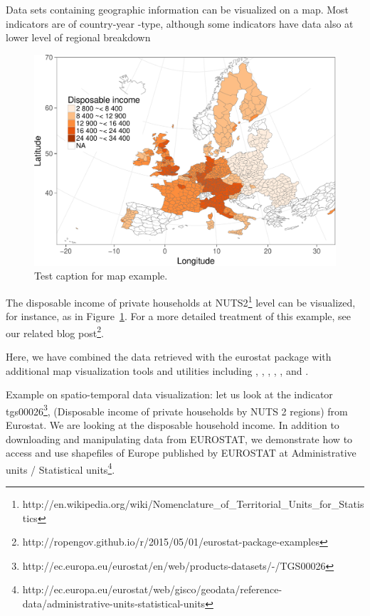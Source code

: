 Data sets containing geographic information can be visualized on a
map. Most indicators are of country-year -type, although some
indicators have data also at lower level of regional breakdown

\begin{figure}
\begin{center}
\includegraphics{2015-manu-mapexample-1}
\caption{Test caption for map example.}
\label{fig:mapexample}
\end{center}
\end{figure}


The disposable income of private households at
NUTS2\footnote{http://en.wikipedia.org/wiki/Nomenclature\_of\_Territorial\_Units\_for\_Statistics}
level can be visualized, for instance, as in
Figure~\ref{fig:mapexample}. For a more detailed treatment of this
example, see our related blog
post\footnote{http://ropengov.github.io/r/2015/05/01/eurostat-package-examples}.

Here, we have combined the data retrieved with the eurostat package
with additional map visualization tools and utilities including
 \citep{grid},  \citep{maptools},  \citep{rgdal},
 \citep{rgeos},  \citep{scales}, and
 \citep{stringr}.

Example on spatio-temporal data visualization: let us look at the
indicator
tgs00026\footnote{http://ec.europa.eu/eurostat/en/web/products-datasets/-/TGS00026},
(Disposable income of private households by NUTS 2 regions) from
Eurostat. We are looking at the disposable household income. In
addition to downloading and manipulating data from EUROSTAT, we
demonstrate how to access and use shapefiles of Europe published by
EUROSTAT at Administrative units / Statistical
units\footnote{http://ec.europa.eu/eurostat/web/gisco/geodata/reference-data/administrative-units-statistical-units}.


